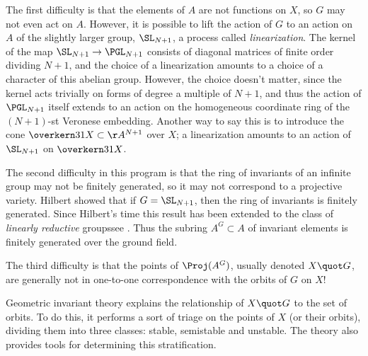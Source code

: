The first difficulty is that the elements of $A$ are not functions on $X$, so $G$ may not even act on $A$. However,
it is possible to lift the action of $G$ to an action on $A$ of the
slightly larger group, $\SL_{N+1}$, a process called
%
\emph{linearization}. The kernel of the map $\SL_{N+1} \to \PGL_{N+1}$
consists of diagonal matrices of finite order dividing $N+1$, and the choice of
a linearization amounts to a choice of a character of this abelian
group. However, the choice doesn't
matter,
since the kernel acts trivially on forms of degree a multiple
of $N+1$,
and thus
the action of $\PGL_{N+1}$ itself  extends to an action on the
homogeneous coordinate ring of the $(N+1)$-st Veronese embedding.
Another way to say this is to introduce the cone $\overkern31 X
\subset \AA^{N+1}$ over $X$; a linearization amounts to an action of
$\SL_{N+1}$ on $\overkern31 X$.%
{\meshing\par}

The second difficulty in this program is that the ring of invariants
of an infinite group may not
be finitely generated,
so it may not correspond to a projective variety. Hilbert showed that if $G= \SL_{N+1}$, then the ring of invariants
is finitely generated. Since Hilbert's time this result has been extended to the class of
\emph{linearly reductive}
%
groups\emdash see \cite{MR0382294}.
Thus the subring $A^G \subset A$ of invariant elements is finitely generated over the ground field.

The third difficulty is that the points of $\Proj(A^G)$, usually
%
denoted $X\quot G$, are generally not in one-to-one correspondence
with the orbits of $G$ on $X$!

Geometric invariant theory explains the relationship of $X\quot G$ to the set of orbits. To do this, it performs a sort of triage on the points of $X$ (or their orbits), dividing them into three classes: stable, semistable and unstable. The theory also provides tools for determining this stratification.


